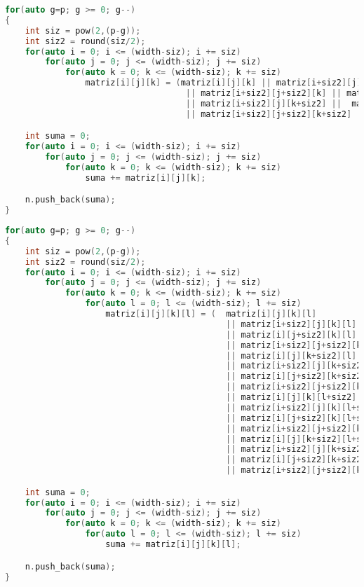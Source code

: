 \begin{lstlisting}[language=C++,caption={Primera versión del Boxcount3D programado en C++},label=CppBox3D,basicstyle=\tiny]
for(auto g=p; g >= 0; g--)
{
    int siz = pow(2,(p-g));
    int siz2 = round(siz/2);
    for(auto i = 0; i <= (width-siz); i += siz)
        for(auto j = 0; j <= (width-siz); j += siz)
            for(auto k = 0; k <= (width-siz); k += siz)
                matriz[i][j][k] = (matriz[i][j][k] || matriz[i+siz2][j][k] || matriz[i][j+siz2][k] 
                                    || matriz[i+siz2][j+siz2][k] || matriz[i][j][k+siz2] 
                                    || matriz[i+siz2][j][k+siz2] ||  matriz[i][j+siz2][k+siz2] 
                                    || matriz[i+siz2][j+siz2][k+siz2]  );

    int suma = 0; 
    for(auto i = 0; i <= (width-siz); i += siz)
        for(auto j = 0; j <= (width-siz); j += siz)
            for(auto k = 0; k <= (width-siz); k += siz)
                suma += matriz[i][j][k];

    n.push_back(suma);
}
\end{lstlisting}

\newpage
\begin{lstlisting}[language=C++,caption={Primera versión del Boxcount4D programado en C++},label=CppBox4D,basicstyle=\tiny]
for(auto g=p; g >= 0; g--)
{
    int siz = pow(2,(p-g));
    int siz2 = round(siz/2);
    for(auto i = 0; i <= (width-siz); i += siz)
        for(auto j = 0; j <= (width-siz); j += siz)
            for(auto k = 0; k <= (width-siz); k += siz)
                for(auto l = 0; l <= (width-siz); l += siz)
                    matriz[i][j][k][l] = (  matriz[i][j][k][l] 
                                            || matriz[i+siz2][j][k][l] 
                                            || matriz[i][j+siz2][k][l] 
                                            || matriz[i+siz2][j+siz2][k][l] 
                                            || matriz[i][j][k+siz2][l] 
                                            || matriz[i+siz2][j][k+siz2][l] 
                                            || matriz[i][j+siz2][k+siz2][l] 
                                            || matriz[i+siz2][j+siz2][k+siz2][l] 
                                            || matriz[i][j][k][l+siz2] 
                                            || matriz[i+siz2][j][k][l+siz2] 
                                            || matriz[i][j+siz2][k][l+siz2] 
                                            || matriz[i+siz2][j+siz2][k][l+siz2] 
                                            || matriz[i][j][k+siz2][l+siz2] 
                                            || matriz[i+siz2][j][k+siz2][l+siz2] 
                                            || matriz[i][j+siz2][k+siz2][l+siz2] 
                                            || matriz[i+siz2][j+siz2][k+siz2][l+siz2] );

    int suma = 0; 
    for(auto i = 0; i <= (width-siz); i += siz)
        for(auto j = 0; j <= (width-siz); j += siz)
            for(auto k = 0; k <= (width-siz); k += siz)
                for(auto l = 0; l <= (width-siz); l += siz)
                    suma += matriz[i][j][k][l];

    n.push_back(suma);
}
\end{lstlisting}

